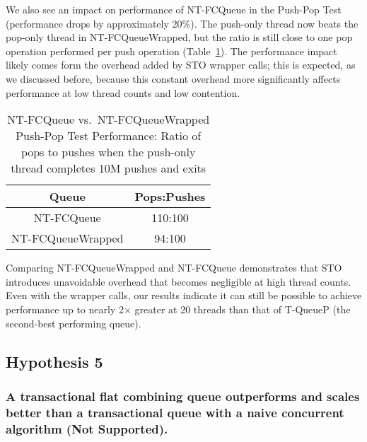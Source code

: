 We also see an impact on performance of NT-FCQueue in the Push-Pop Test (performance drops by approximately 20\%). The push-only thread now beats the pop-only thread in NT-FCQueueWrapped, but the ratio is still close to one pop operation performed per push operation (Table~\ref{tab:nt_pop_push_ratio}). The performance impact likely comes form the overhead added by STO wrapper calls; this is expected, as we discussed before, because this constant overhead more significantly affects performance at low thread counts and low contention.

\begin{table}[ht!]
        \centering
    \begin{tabular}{|cc|}
        \hline
        Queue & Pops:Pushes\\
        \hline
            NT-FCQueue & 110:100\\
            NT-FCQueueWrapped & 94:100\\
        \hline
    \end{tabular}
    \caption{NT-FCQueue vs.\ NT-FCQueueWrapped Push-Pop Test Performance: Ratio of pops to pushes when the push-only thread completes 10M pushes and exits}
    \label{tab:nt_pop_push_ratio}
\end{table}

Comparing NT-FCQueueWrapped and NT-FCQueue demonstrates that STO introduces unavoidable overhead that becomes negligible at high thread counts. Even with the wrapper calls, our results indicate it can still be possible to achieve performance up to nearly 2$\times$ greater at 20 threads than that of T-QueueP (the second-best performing queue).

\vspace{12pt}
\noindent{}

\subsection{Hypothesis 5}
\subsubsection{A transactional flat combining queue outperforms and scales better than a transactional queue with a naive concurrent algorithm (Not Supported).}
\label{eval:hypo5}

